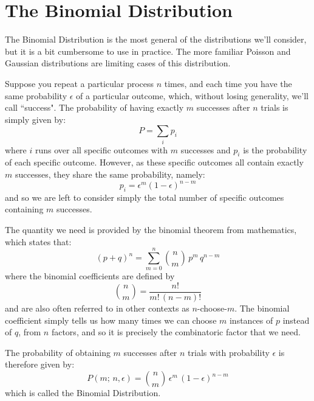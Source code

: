 \documentclass[12pt]{article}
\begin{document}
\section{The  Binomial Distribution}

The Binomial Distribution is the most general of the distributions we'll consider, but it is a bit cumbersome to use in practice.  The more familiar Poisson and Gaussian distributions are limiting cases of this distribution.  

Suppose you repeat a particular process $n$ times, and each time you have the same probability $\epsilon$ of a particular outcome, which, without losing generality, we'll call ``success".  The probability of having exactly $m$ successes after $n$ trials is simply given by:
\begin{displaymath}
P = \sum_i p_i
\end{displaymath}
where $i$ runs over all specific outcomes with $m$ successes and $p_i$ is the probability of each specific outcome.   However, as these specific outcomes all contain exactly $m$ successes, they share the same probability, namely:
\begin{displaymath}
p_i = \epsilon^m (1 - \epsilon)^{n-m}
\end{displaymath}
and so we are left to consider simply the total number of specific outcomes containing $m$ successes.  

The quantity we need is provided by the binomial theorem from mathematics, which states that:
\begin{equation}
\label{eqn:binomt}
(p+q)^n = \sum_{m=0}^{n} \binom{n}{m} \, p^m \, q^{n-m}
\end{equation}
where the binomial coefficients are defined by
\begin{equation}
\label{eqn:binomc}
\binom{n}{m} = \frac{n!}{m! \, (n-m)!}
\end{equation}
and are also often referred to in other contexts as $n$-choose-$m$.  The binomial coefficient simply tells us how many times we can choose $m$ instances of $p$ instead of $q$, from $n$ factors, and so it is precisely the combinatoric factor that we need.

The probability of obtaining $m$ successes after $n$ trials with probability $\epsilon$ is therefore given by:
\begin{equation}
\label{eqn:binom}
P(m; \, n ,\epsilon) = \binom{n}{m} \, \epsilon^m \, (1 - \epsilon)^{n-m}
\end{equation}
which is called the Binomial Distribution.
\end{document}

